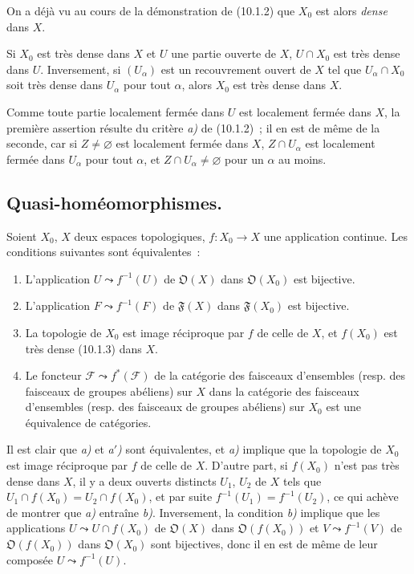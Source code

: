 On a déjà vu au cours de la démonstration de (10.1.2) que $X_0$ est alors
\emph{dense} dans $X$.

\begin{corollary}[10.1.4]
\label{IV.10.1.4-fr}
Si $X_0$ est très dense dans $X$ et $U$ une partie ouverte de $X$,
$U\cap X_0$ est très dense dans $U$. Inversement, si $(U_\alpha)$ est un
recouvrement ouvert de $X$ tel que $U_\alpha\cap X_0$ soit très dense dans
$U_\alpha$ pour tout $\alpha$, alors $X_0$ est très dense dans $X$.
\end{corollary}

Comme toute partie localement fermée dans $U$ est localement fermée dans $X$,
la première assertion résulte du critère \emph{a)} de (10.1.2)~; il en est de
même de la seconde, car si $Z\neq\varnothing$ est localement fermée dans $X$,
$Z\cap U_\alpha$ est localement fermée dans $U_\alpha$ pour tout $\alpha$,
et $Z\cap U_\alpha\neq\varnothing$ pour un $\alpha$ au moins.

\subsection{Quasi-homéomorphismes.}
\label{subsection:IV.10.2-fr}

\begin{proposition}[10.2.1]
Soient $X_0$, $X$ deux espaces topologiques, $f:X_0\to X$ une application
continue. Les conditions suivantes sont équivalentes~:
\begin{enumerate}[label=\emph{\alph*)}]
  \item L'application $U\leadsto f^{-1}(U)$ de $\mathfrak O(X)$ dans
  $\mathfrak O(X_0)$ est bijective.
  \item[\emph{a$'$)}] L'application $F\leadsto f^{-1}(F)$ de $\mathfrak F(X)$
  dans $\mathfrak F(X_0)$ est bijective.
  \item La topologie de $X_0$ est image réciproque par $f$ de celle de $X$, et
  $f(X_0)$ est très dense \textup{(10.1.3)} dans $X$.
  \item Le foncteur $\mathcal F\leadsto f^*(\mathcal F)$ de la catégorie des
  faisceaux d'ensembles (\textup{resp.} des faisceaux de groupes abéliens) sur $X$ dans
  la catégorie des faisceaux d'ensembles (\textup{resp.} des faisceaux de groupes
  abéliens) sur $X_0$ est une équivalence de catégories.
\end{enumerate}
\end{proposition}

Il est clair que \emph{a)} et \emph{a$'$)} sont équivalentes, et \emph{a)}
implique que la topologie de $X_0$ est image réciproque par $f$ de celle de
$X$. D'autre part, si $f(X_0)$ n'est pas très dense dans $X$, il y a deux
ouverts distincts $U_1$, $U_2$ de $X$ tels que
$U_1\cap f(X_0)=U_2\cap f(X_0)$, et par suite
$f^{-1}(U_1)=f^{-1}(U_2)$, ce qui achève de montrer que \emph{a)} entraîne
\emph{b)}. Inversement, la condition \emph{b)} implique que les applications
$U\leadsto U\cap f(X_0)$ de $\mathfrak O(X)$ dans $\mathfrak O(f(X_0))$ et
$V\leadsto f^{-1}(V)$ de $\mathfrak O(f(X_0))$ dans $\mathfrak O(X_0)$ sont
bijectives, donc il en est de même de leur composée $U\leadsto f^{-1}(U)$.

